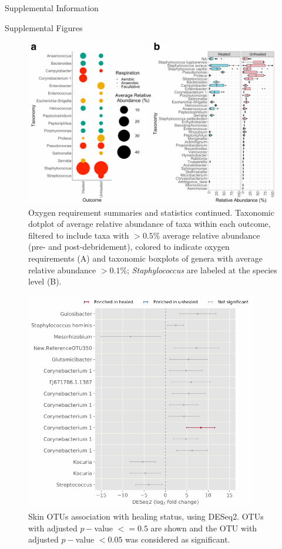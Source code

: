 \documentclass[oneside,12pt,final]{sty/ucthesis-CA2012}
\begin{document}
\begin{mainmatter}
\begin{section}{Supplemental Information}
\begin{subsection}{Supplemental Figures}
\begin{figure}[h]
\centering
\centerline{\includegraphics[width=\textwidth]{fig/C3figS9DE.pdf}}
\caption{Oxygen requirement summaries and statistics continued. Taxonomic dotplot of average relative abundance of taxa within each outcome, filtered to include taxa with $>0.5$\% average relative abundance (pre- and post-debridement), colored to indicate oxygen requirements (A) and taxonomic boxplots of genera with average relative abundance $>0.1$\%; \textit{Staphylococcus} are labeled at the species level (B).}
\label{fig:S9DE}
\end{figure}

\begin{figure}[h]
\centering
\centerline{\includegraphics[width=0.9\textwidth]{fig/C3figS10.pdf}}
\caption{Skin OTUs association with healing status, using DESeq2. OTUs with adjusted $p-$value $<= 0.5$ are shown and the OTU with adjusted $p-$value $< 0.05$ was considered as significant.}
\label{fig:figS10}
\end{figure}


\end{subsection}
\end{section}
\end{mainmatter}
\end{document}
